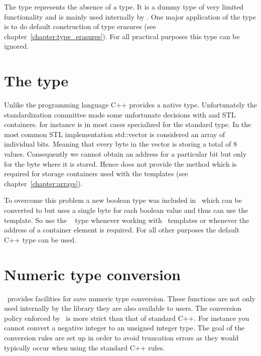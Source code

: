 The  type represents the absence of a type. It is a dummy type 
of very limited functionality and is mainly used internally by 
\libpnicore. One major application of the  type is to do default
construction of type erasures (see chapter~\ref{chapter:type_erasures}). 
For all practical purposes this type can be ignored.

\section{The  type}\label{section:using_bool}

Unlike the  programming language C++ provides a native  type. 
Unfortunately the  standardization committee made some unfortunate 
decisions with  and STL containers.  for instance is
in most cases specialized for the standard   type. 
In the most common STL implementation {\cpp std::vector} is considered an 
array of individual bits. Meaning that every byte in the vector is storing a
total of $8$  values. Consequently we cannot obtain an address 
for a particular bit but only for the byte where it is stored. 
Hence  does not provide the  method 
which is required for storage containers used with the  templates
(see chapter~\ref{chapter:arrays}). 

To overcome this problem a new boolean type was included in \libpnicore\ which 
can be converted to  but uses a single byte for each boolean value and
thus can use the  template. So use the \libpnicore\
 type whenever working with \libpnicore\ templates or whenever the
address of a container element is required. For all other purposes the default
C++ \cpp{bool} type can be used.

\section{Numeric type conversion}

\libpnicore\ provides facilities for save numeric type conversion. These
functions are not only used internally by the library they are also available to
users.  The conversion policy enforced by \libpnicore\ is more strict than that
of standard C++. For instance you cannot convert a negative integer to an
unsigned integer type. The goal of the conversion rules are set up in order to
avoid truncation errors as they would typically occur when using the standard
C++ rules.

